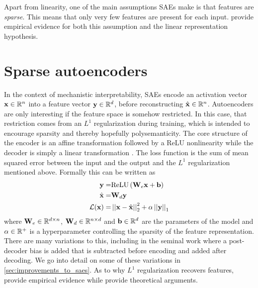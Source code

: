 Apart from linearity, one of the main assumptions SAEs make is that features are \emph{sparse}.
This means that only very few features are present for each input.
\cite{deng_measuring_2023} provide empirical evidence for both this assumption and the linear representation hypothesis.

\section{Sparse autoencoders}
In the context of mechanistic interpretability, SAEs  encode an activation vector $\mathbf{x}\in\mathbb{R}^{n}$ into a feature vector $\mathbf{y}\in\mathbb{R}^d$, before reconstructing $\hat{\mathbf{x}}\in\mathbb{R}^n$.
Autoencoders are only interesting if the feature space is somehow restricted.
In this case, that restriction comes from an $L^1$ regularization during training, which is intended to encourage sparsity and thereby hopefully polysemanticity.
The core structure of the encoder is an affine transformation followed by a ReLU nonlinearity while the decoder is simply a linear transformation \cite{cunningham_sparse_2023}.
The loss function is the sum of mean squared error between the input and the output and the $L^1$ regularization mentioned above.
Formally this can be written as
\begin{align*}
    \mathbf{y}=&\mathrm{ReLU}\left(\mathbf{W}_e\mathbf{x}+\mathbf{b}\right)\\
    \hat{\mathbf{x}}=&\mathbf{W}_d\mathbf{y}\\
    \mathcal L(\mathbf{x})=&\left\lvert\left\lvert\mathbf{x}-\hat{\mathbf{x}}\right\lvert\right\lvert_2^2+\alpha\left\lvert\left\lvert\mathbf{y}\right\lvert\right\lvert_1
\end{align*}
where $\mathbf{W}_e\in\mathbb{R}^{d\times n}$, $\mathbf{W}_d\in\mathbb{R}^{n\times d}$ and $\mathbf{b}\in\mathbb{R}^d$ are the parameters of the model and $\alpha\in\mathbb{R}^+$ is a hyperparameter controlling the sparsity of the feature representation.
There are many variations to this, including in the seminal work \cite{bricken_towards_2023} where a post-decoder bias is added that is subtracted before encoding and added after decoding.
We go into detail on some of these variations in \ref{sec:improvements_to_saes}.
As to why $L^1$ regularization recovers features, \cite{sharkey_interim_2022} provide empirical evidence while \cite{wright_high-dimensional_2022} provide theoretical arguments.


